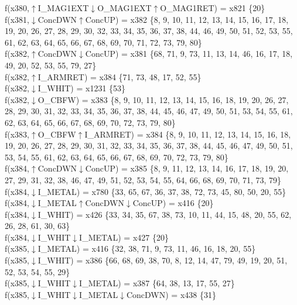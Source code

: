 f(x380,$\uparrow$I\_MAG1EXT$\downarrow$O\_MAG1EXT$\uparrow$O\_MAG1RET) = x821 \{20\} \\  
f(x381,$\downarrow$ConcDWN$\uparrow$ConcUP) = x382 \{8, 9, 10, 11, 12, 13, 14, 15, 16, 17, 18, 19, 20, 26, 27, 28, 29, 30, 32, 33, 34, 35, 36, 37, 38, 44, 46, 49, 50, 51, 52, 53, 55, 61, 62, 63, 64, 65, 66, 67, 68, 69, 70, 71, 72, 73, 79, 80\} \\  
f(x382,$\uparrow$ConcDWN$\downarrow$ConcUP) = x381 \{68, 71, 9, 73, 11, 13, 14, 46, 16, 17, 18, 49, 20, 52, 53, 55, 79, 27\} \\  
f(x382,$\uparrow$I\_ARMRET) = x384 \{71, 73, 48, 17, 52, 55\} \\  
f(x382,$\downarrow$I\_WHIT) = x1231 \{53\} \\  
f(x382,$\downarrow$O\_CBFW) = x383 \{8, 9, 10, 11, 12, 13, 14, 15, 16, 18, 19, 20, 26, 27, 28, 29, 30, 31, 32, 33, 34, 35, 36, 37, 38, 44, 45, 46, 47, 49, 50, 51, 53, 54, 55, 61, 62, 63, 64, 65, 66, 67, 68, 69, 70, 72, 73, 79, 80\} \\  
f(x383,$\uparrow$O\_CBFW$\uparrow$I\_ARMRET) = x384 \{8, 9, 10, 11, 12, 13, 14, 15, 16, 18, 19, 20, 26, 27, 28, 29, 30, 31, 32, 33, 34, 35, 36, 37, 38, 44, 45, 46, 47, 49, 50, 51, 53, 54, 55, 61, 62, 63, 64, 65, 66, 67, 68, 69, 70, 72, 73, 79, 80\} \\  
f(x384,$\uparrow$ConcDWN$\downarrow$ConcUP) = x385 \{8, 9, 11, 12, 13, 14, 16, 17, 18, 19, 20, 27, 29, 31, 32, 38, 46, 47, 49, 51, 52, 53, 54, 55, 64, 66, 68, 69, 70, 71, 73, 79\} \\  
f(x384,$\downarrow$I\_METAL) = x780 \{33, 65, 67, 36, 37, 38, 72, 73, 45, 80, 50, 20, 55\} \\  
f(x384,$\downarrow$I\_METAL$\uparrow$ConcDWN$\downarrow$ConcUP) = x416 \{20\} \\  
f(x384,$\downarrow$I\_WHIT) = x426 \{33, 34, 35, 67, 38, 73, 10, 11, 44, 15, 48, 20, 55, 62, 26, 28, 61, 30, 63\} \\  
f(x384,$\downarrow$I\_WHIT$\downarrow$I\_METAL) = x427 \{20\} \\  
f(x385,$\downarrow$I\_METAL) = x416 \{32, 38, 71, 9, 73, 11, 46, 16, 18, 20, 55\} \\  
f(x385,$\downarrow$I\_WHIT) = x386 \{66, 68, 69, 38, 70, 8, 12, 14, 47, 79, 49, 19, 20, 51, 52, 53, 54, 55, 29\} \\  
f(x385,$\downarrow$I\_WHIT$\downarrow$I\_METAL) = x387 \{64, 38, 13, 17, 55, 27\} \\  
f(x385,$\downarrow$I\_WHIT$\downarrow$I\_METAL$\downarrow$ConcDWN) = x438 \{31\} \\  
